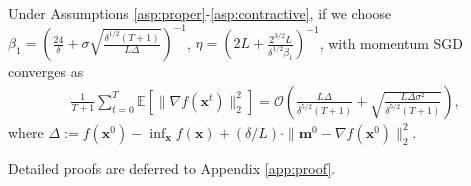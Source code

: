 \begin{corollary}
    Under Assumptions \ref{asp:proper}-\ref{asp:contractive}, if we choose $\beta_1=\left(\frac{24}{\delta}+\sigma\sqrt{\frac{\delta^{1/2}\left(T+1\right)}{L\Delta}}\right)^{-1}$, $\eta=\left(2L+ \frac{2^{3/2}L}{\delta^{1/2}\beta_1}\right)^{-1}$, \celora with momentum SGD converges as
    \begin{align}
        &\frac{1}{T+1}\sum_{t=0}^{T}\mathbb{E}[\|\nabla f(\mathbf{x}^t)\|_2^2]
        =\mathcal{O}\left(\frac{L\Delta}{\delta^{5/2}(T+1)}+\sqrt{\frac{L\Delta\sigma^2}{\delta^{5/2}(T+1)}}\right),\nonumber
    \end{align}
    where $\Delta:=f(\mathbf{x}^0)-\inf_{\mathbf{x}}f(\mathbf{x})+(\delta/L)\cdot\|\mathbf{m}^0-\nabla f(\mathbf{x}^0)\|_2^2$.
\end{corollary}

Detailed proofs are deferred to Appendix \ref{app:proof}.